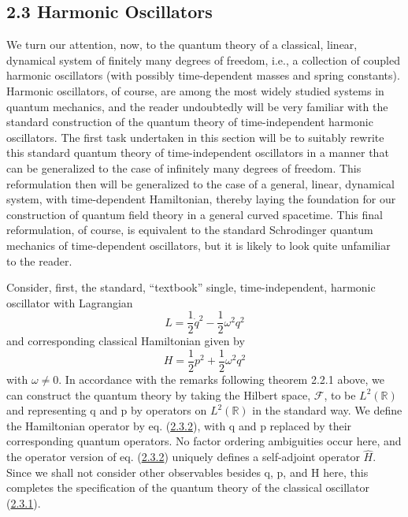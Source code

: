 \documentclass[11pt,a4paper]{article}
\begin{document}
\subsection*{2.3 Harmonic Oscillators}\hypertarget{sec:2.3}{}

We turn our attention, now, to the quantum theory of a classical, linear, dynamical system of finitely many degrees of freedom, i.e., a collection of coupled harmonic oscillators (with possibly time-dependent masses and spring constants). Harmonic oscillators, of course, are among the most widely studied systems in quantum mechanics, and the reader undoubtedly will be very familiar with the standard construction of the quantum theory of time-independent harmonic oscillators. The first task undertaken in this section will be to suitably rewrite this standard quantum theory of time-independent oscillators in a manner that can be generalized to the case of infinitely many degrees of freedom. This reformulation then will be generalized to the case of a general, linear, dynamical system, with time-dependent Hamiltonian, thereby laying the foundation for our construction of quantum field theory in a general curved spacetime. This final reformulation, of course, is equivalent to the standard Schrodinger quantum mechanics of time-dependent oscillators, but it is likely to look quite unfamiliar to the reader.

Consider, first, the standard, ``textbook'' single, time-independent, harmonic oscillator with Lagrangian
\begin{equation*}
L = \frac{1}{2} \dot{q}^2 - \frac{1}{2} \omega^2 q^2 \tag{2.3.1}\label{eq:2.3.1}
\end{equation*}
and corresponding classical Hamiltonian given by
\begin{equation*}
H = \frac{1}{2} p^2 + \frac{1}{2} \omega^2 q^2 \tag{2.3.2}\label{eq:2.3.2}
\end{equation*}
with \(\omega \neq 0\). In accordance with the remarks following theorem 2.2.1 above, we can construct the quantum theory by taking the Hilbert space, \(\mathcal{F}\), to be \(L^2(\mathbb{R})\) and representing q and p by operators on \(L^2(\mathbb{R})\) \hypertarget{source-35}{} in the standard way. We define the Hamiltonian operator by eq. (\hyperref[eq:2.3.2]{2.3.2}), with q and p replaced by their corresponding quantum operators. No factor ordering ambiguities occur here, and the operator version of eq. (\hyperref[eq:2.3.2]{2.3.2}) uniquely defines a self-adjoint operator \(\hat{H}\). Since we shall not consider other observables besides q, p, and H here, this completes the specification of the quantum theory of the classical oscillator (\hyperref[eq:2.3.1]{2.3.1}).
\end{document}
